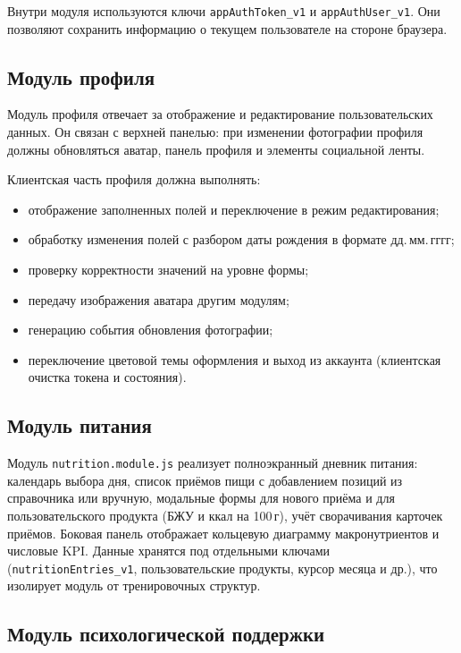 Внутри модуля используются ключи \texttt{appAuthToken\_v1} и \texttt{appAuthUser\_v1}. Они позволяют сохранить информацию о текущем пользователе на стороне браузера.

\subsection{Модуль профиля}

Модуль профиля отвечает за отображение и редактирование пользовательских данных. Он связан с верхней панелью: при изменении фотографии профиля должны обновляться аватар, панель профиля и элементы социальной ленты.

Клиентская часть профиля должна выполнять:
\begin{itemize}
	\item отображение заполненных полей и переключение в режим редактирования;
	\item обработку изменения полей с разбором даты рождения в формате дд.\,мм.\,гггг;
	\item проверку корректности значений на уровне формы;
	\item передачу изображения аватара другим модулям;
	\item генерацию события обновления фотографии;
	\item переключение цветовой темы оформления и выход из аккаунта (клиентская очистка токена и состояния).
\end{itemize}

\subsection{Модуль питания}

Модуль \texttt{nutrition.module.js} реализует полноэкранный дневник питания: календарь выбора дня, список приёмов пищи с добавлением позиций из справочника или вручную, модальные формы для нового приёма и для пользовательского продукта (БЖУ и ккал на 100\,г), учёт сворачивания карточек приёмов. Боковая панель отображает кольцевую диаграмму макронутриентов и числовые KPI. Данные хранятся под отдельными ключами (\texttt{nutritionEntries\_v1}, пользовательские продукты, курсор месяца и др.), что изолирует модуль от тренировочных структур.

\subsection{Модуль психологической поддержки}

